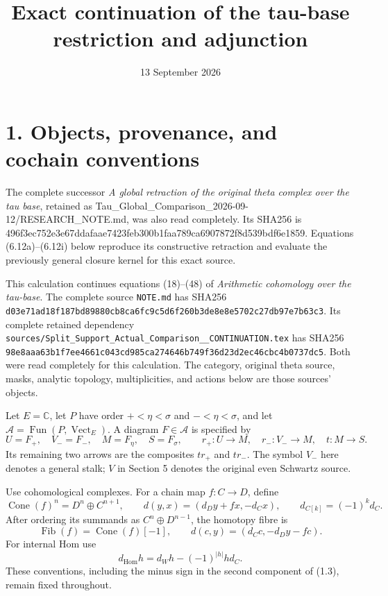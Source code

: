 \documentclass[
  11pt,
]{article}
\title{Exact continuation of the tau-base restriction and adjunction}
\author{}
\date{13 September 2026}
\begin{document}
\maketitle

\section{1. Objects, provenance, and cochain
conventions}\label{objects-provenance-and-cochain-conventions}

The complete successor \emph{A global retraction of the original theta
complex over the tau base}, retained as
Tau\_Global\_Comparison\_2026-09-12/RESEARCH\_NOTE.md, was also read
completely. Its SHA256 is
496f3ec752e3e67ddafaae7423feb300b1faa789ca6907872f8d539bdf6e1859.
Equations (6.12a)--(6.12i) below reproduce its constructive retraction
and evaluate the previously general closure kernel for this exact
source.

This calculation continues equations (18)--(48) of \emph{Arithmetic
cohomology over the tau-base}. The complete source \texttt{NOTE.md} has
SHA256
\texttt{d03e71ad\allowbreak{}18f187bd\allowbreak{}89880cb8\allowbreak{}ca6fc9c5\allowbreak{}d6f260b3\allowbreak{}de8e8e57\allowbreak{}02c27db9\allowbreak{}7e7b63c3}.
Its complete retained dependency
\texttt{sources/\allowbreak{}Split\_\allowbreak{}Support\_\allowbreak{}Actual\_\allowbreak{}Comparison\_\allowbreak{}\_\allowbreak{}CONTINUATION.tex}
has SHA256
\texttt{98e8aaa6\allowbreak{}3b1f7ee4\allowbreak{}661c043c\allowbreak{}d985ca27\allowbreak{}4646b749\allowbreak{}f36d23d2\allowbreak{}ec46cbc4\allowbreak{}b0737dc5}.
Both were read completely for this calculation. The category, original
theta source, masks, analytic topology, multiplicities, and actions
below are those sources' objects.

Let \(E=\mathbb C\), let \(P\) have order \(+<\eta<\sigma\) and
\(-<\eta<\sigma\), and let
\(\mathcal A=\operatorname{Fun}(P,\operatorname{Vect}_E)\). A diagram
\(F\in\mathcal A\) is specified by \[
U=F_+,\quad V_-=F_-,\quad M=F_\eta,\quad S=F_\sigma,
\qquad r_+:U\to M,\quad r_-:V_-\to M,\quad t:M\to S.
\tag{1.1}
\] Its remaining two arrows are the composites \(tr_+\) and \(tr_-\).
The symbol \(V_-\) here denotes a general stalk; \(V\) in Section 5
denotes the original even Schwartz source.

Use cohomological complexes. For a chain map \(f:C\to D\), define \[
\operatorname{Cone}(f)^n=D^n\oplus C^{n+1},\qquad
d(y,x)=(d_Dy+fx,-d_Cx),\qquad
d_{C[k]}=(-1)^k d_C.
\tag{1.2}
\] After ordering its summands as \(C^n\oplus D^{n-1}\), the homotopy
fibre is \[
\operatorname{Fib}(f)=\operatorname{Cone}(f)[-1],\qquad
d(c,y)=(d_Cc,-d_Dy-fc).
\tag{1.3}
\] For internal Hom use \[
d_{\operatorname{Hom}}h=d_Wh-(-1)^{|h|}h d_C.
\tag{1.4}
\] These conventions, including the minus sign in the second component
of (1.3), remain fixed throughout.
\end{document}
